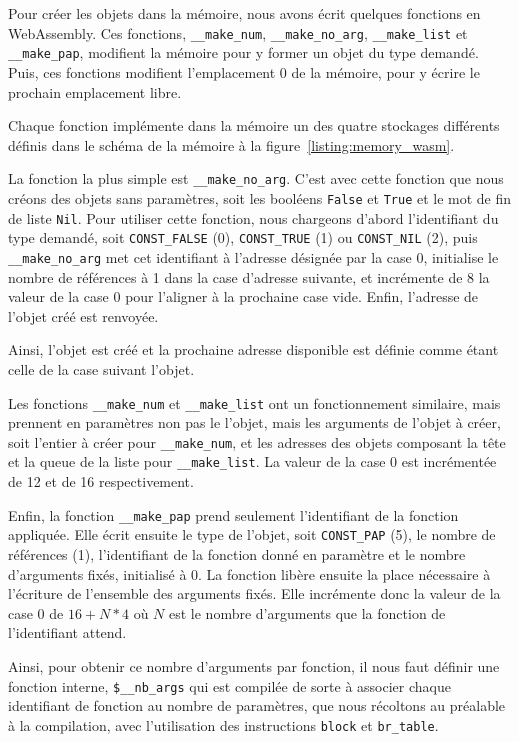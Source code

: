 \documentclass{rapportECL}
\begin{document}
Pour créer les objets dans la mémoire, nous avons écrit quelques fonctions en WebAssembly.
Ces fonctions, \verb|__make_num|, \verb|__make_no_arg|, \verb|__make_list| et \verb|__make_pap|, modifient la mémoire
pour y former un objet du type demandé. Puis, ces fonctions modifient l'emplacement 0 de la mémoire, pour y écrire le
prochain emplacement libre. 

Chaque fonction implémente dans la mémoire un des quatre stockages différents définis dans le schéma de la 
mémoire à la figure~\ref{listing:memory_wasm}.

\bigskip

La fonction la plus simple est \verb|__make_no_arg|. C'est avec cette fonction que nous créons des objets sans paramètres,
soit les booléens \verb|False| et \verb|True| et le mot de fin de liste \verb|Nil|. Pour utiliser cette fonction,
nous chargeons d'abord l'identifiant du type demandé, soit \verb|CONST_FALSE| (0), \verb|CONST_TRUE| (1) ou \verb|CONST_NIL| (2),
puis \verb|__make_no_arg| met cet identifiant à l'adresse désignée par la case 0, initialise le nombre de références à 1 dans la
case d'adresse suivante, et incrémente de 8 la valeur de la case 0 pour l'aligner à la prochaine case vide. 
Enfin, l'adresse de l'objet créé est renvoyée.

Ainsi, l'objet est créé et la prochaine adresse disponible est définie comme étant celle de la case suivant l'objet.

\bigskip

Les fonctions \verb|__make_num| et \verb|__make_list| ont un fonctionnement similaire, mais prennent en paramètres non pas le 
l'objet, mais les arguments de l'objet à créer, soit l'entier à créer pour \verb|__make_num|, et les adresses des objets composant la tête et la 
queue de la liste pour \verb|__make_list|. La valeur de la case 0 est incrémentée de 12 et de 16 respectivement.

\bigskip

Enfin, la fonction \verb|__make_pap| prend seulement l'identifiant de la fonction appliquée. Elle écrit ensuite le type de l'objet, 
soit \verb|CONST_PAP| (5), le nombre de références (1), l'identifiant de la fonction donné en paramètre et le nombre d'arguments 
fixés, initialisé à 0. La fonction libère ensuite la place nécessaire à l'écriture de l'ensemble des arguments fixés.
Elle incrémente donc la valeur de la case 0 de $16 + N * 4 $ où $N$ est le nombre d'arguments que la fonction de l'identifiant attend.

Ainsi, pour obtenir ce nombre d'arguments par fonction, il nous faut définir une fonction interne, \verb|$__nb_args| qui est 
compilée de sorte à associer chaque identifiant de fonction au nombre de paramètres, que nous récoltons au préalable à la 
compilation, avec l'utilisation des instructions \verb|block| et \verb|br_table|.
\end{document}
